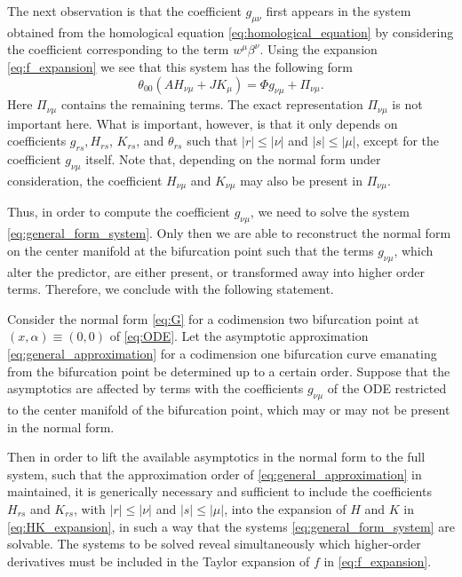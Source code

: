 The next observation is that the coefficient $g_{\mu\nu}$ first appears in the
system obtained from the homological equation \cref{eq:homological_equation} by
considering the coefficient corresponding to the term $w^\mu\beta^\nu$.
Using the expansion \cref{eq:f_expansion} we see that this system has the
following form
\begin{equation}
    \label{eq:general_form_system}
    \theta_{00} (A H_{\nu\mu} + J K_\mu) = \Phi g_{\nu\mu} + \Pi_{\nu\mu}.
\end{equation}
Here $\Pi_{\nu\mu}$ contains the remaining terms. The exact representation
$\Pi_{\nu\mu}$  is not important here. What is important, however, is that it
only depends on coefficients $g_{rs}, H_{rs}$, $K_{rs}$, and $\theta_{rs}$ such
that $|r| \leq |\nu|$ and $|s| \leq |\mu|$, except for the
coefficient $g_{\nu\mu}$ itself. Note that, depending on the normal form under
consideration, the coefficient $H_{\nu\mu}$ and $K_{\nu\mu}$ may also be
present in $\Pi_{\nu\mu}$. 

Thus, in order to compute the coefficient $g_{\nu\mu}$, we need to solve the
system \cref{eq:general_form_system}. Only then we are able to reconstruct the
normal form on the center manifold at the bifurcation point such that the terms
$g_{\nu\mu}$, which alter the predictor, are either present, or transformed
away into higher order terms. Therefore, we conclude with the following
statement.

\begin{proposition}
\label{thm:coefficients}
Consider the normal form \cref{eq:G} for a codimension two bifurcation point at
$(x,\alpha) \equiv (0,0)$ of \cref{eq:ODE}. Let the asymptotic approximation 
\cref{eq:general_approximation} for a codimension one bifurcation curve
emanating from the bifurcation point be determined up to a certain order.
Suppose that the asymptotics are affected by terms with the coefficients
$g_{\nu\mu}$ of the ODE restricted to the center manifold of the bifurcation
point, which may or may not be present in the normal form. 

Then in order to lift the available asymptotics in the normal form to the full
system, such that the approximation order of \cref{eq:general_approximation} in
maintained, it is generically necessary and sufficient to include the
coefficients $H_{rs}$ and $K_{rs}$, with $|r| \leq |\nu|$ and $|s| \leq |\mu|$,
into the expansion of $H$ and $K$ in \cref{eq:HK_expansion}, in such a way that
the systems \cref{eq:general_form_system} are solvable. The systems to be
solved reveal simultaneously which higher-order derivatives must be included in
the Taylor expansion of $f$ in \cref{eq:f_expansion}.
\end{proposition}

